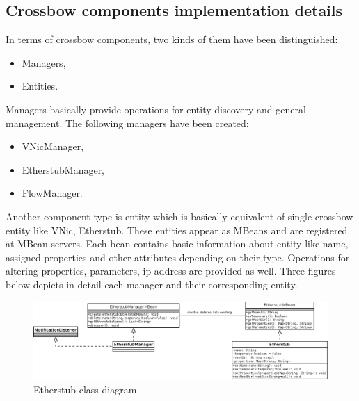 \documentclass[11pt]{book}
\begin{document}
		\subsection{Crossbow components implementation details}
			\label{sec:impl:comp}
	
		In terms of crossbow components, two kinds of them have been distinguished:

		\begin{itemize}
			\item Managers,
			\item Entities.
		\end{itemize}

		Managers basically provide operations for entity discovery and general management. The following managers have
		been created:

		\begin{itemize}
			\item VNicManager,
			\item EtherstubManager,
			\item FlowManager.
		\end{itemize}

		Another component type is entity which is basically equivalent of single crossbow entity like VNic, Etherstub.
		These entities appear as MBeans and are registered at MBean servers. Each bean contains basic information about
		entity like name, assigned properties and other attributes depending on their type. Operations for altering
		properties, parameters, ip address are provided as well. Three figures below depicts in detail each manager and
		their corresponding entity.

        \begin{figure}[H]
          \begin{center}
            \includegraphics[width=1.2\textwidth, angle=90]{img/impl/etherstub.png}
          \end{center}
          \caption{Etherstub class diagram}
        \end{figure}        
\end{document}
